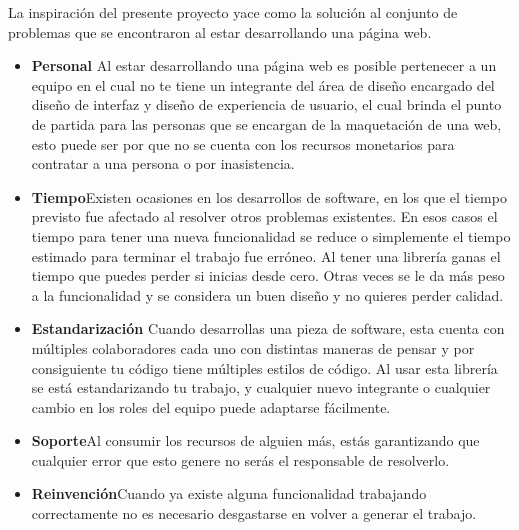 La inspiración del presente proyecto yace como la solución al conjunto de problemas que se encontraron al estar desarrollando una página web.

\begin{itemize}

   \item \textbf{Personal} \newline Al estar desarrollando una página web es posible pertenecer a un equipo en el cual no te tiene un integrante del área de diseño encargado del diseño de interfaz y diseño de experiencia de usuario, el cual brinda el punto de partida para las personas que se encargan de la maquetación de una web, esto puede ser por que no se cuenta con los recursos monetarios para contratar a una persona o por inasistencia.  
   \item \textbf{Tiempo}\newline  Existen ocasiones en los desarrollos de software, en los que el tiempo previsto fue afectado al resolver otros problemas existentes. En esos casos el tiempo para tener una nueva funcionalidad se reduce o simplemente el tiempo estimado para terminar el trabajo fue erróneo. Al tener una librería ganas el tiempo que puedes perder si inicias desde cero. Otras veces se le da más peso a la funcionalidad y se considera un buen diseño y no quieres perder calidad.
   \item \textbf{Estandarización} \newline Cuando desarrollas una pieza de software, esta cuenta con múltiples colaboradores cada uno con distintas maneras de pensar y por consiguiente tu código tiene múltiples estilos de código.   Al usar esta librería se está estandarizando tu trabajo, y cualquier nuevo integrante o cualquier cambio en los roles del equipo puede adaptarse fácilmente.
   \item \textbf{Soporte}\newline  Al consumir los recursos de alguien más, estás garantizando que cualquier error que esto genere no serás el responsable de resolverlo.
   \item \textbf{Reinvención}\newline  Cuando ya existe alguna funcionalidad trabajando correctamente no es necesario desgastarse en volver a generar el trabajo.
\end{itemize}